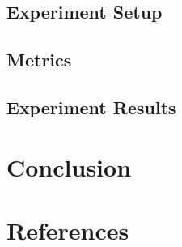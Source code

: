 \documentclass{article}
\begin{document}



\subsection{Experiment Setup}

\subsection{Metrics}


\subsection{Experiment Results}





\section{Conclusion}\label{sec:conclusion}





\section{References}


\end{document}
